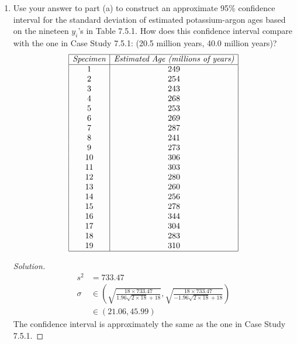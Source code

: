 \documentclass{article}
\begin{document}
\begin{enumerate}[label=(\alph*)]
    \newpage
    \item
    Use your answer to part (a) to construct an approximate 95\% confidence interval for the standard deviation of estimated potassium-argon ages based on the nineteen $y_i$'s in Table 7.5.1. 
    How does this confidence interval compare with the one in Case Study 7.5.1: (20.5 million years, 40.0 million years)?
    \begin{displaymath}
        \begin{array}{|c|c|}
            \hline
            \emph{Specimen} & \emph{Estimated Age (millions of years)} \\
            \hline
            1 & 249 \\
            2 & 254 \\
            3 & 243 \\
            4 & 268 \\
            5 & 253 \\
            6 & 269 \\
            7 & 287 \\
            8 & 241 \\ 
            9 & 273 \\
            10 & 306 \\
            11 & 303 \\
            12 & 280 \\
            13 & 260 \\
            14 & 256 \\
            15 & 278 \\
            16 & 344 \\
            17 & 304 \\
            18 & 283 \\
            19 & 310 \\            
            \hline
        \end{array}
    \end{displaymath}
    \begin{proof}[Solution]
        \begin{align*}
            s^2 & = 733.47 \\
            \sigma & \in \left(\sqrt{\frac{18\times 733.47}{1.96\sqrt{2\times 18}+18}}, \sqrt{\frac{18\times 733.47}{-1.96\sqrt{2\times 18}+18}}\right) \\
            & \in (21.06, 45.99)
        \end{align*}
        The confidence interval is approximately the same as the one in Case Study 7.5.1.
    \end{proof}
\end{enumerate}
\end{document}
